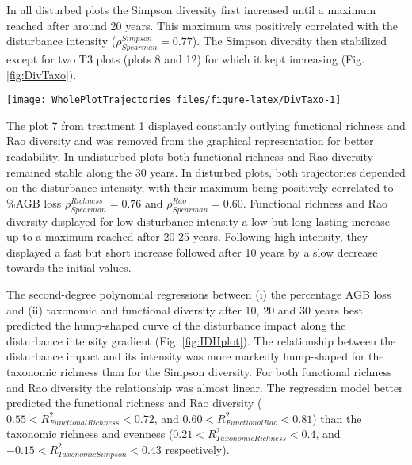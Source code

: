 \documentclass[fleqn,10pt]{ArtEcoFoG} %
\begin{document}
In all disturbed plots the Simpson diversity first increased until a
maximum reached after around 20 years. This maximum was positively
correlated with the disturbance intensity
(\(\rho_{Spearman}^{Simpson}=0.77\)). The Simpson diversity then
stabilized except for two T3 plots (plots 8 and 12) for which it kept
increasing (Fig. \ref{fig:DivTaxo}).

\begin{figure*}

{\centering \texttt{[image: WholePlotTrajectories\_files/figure-latex/DivTaxo-1]} 

}

\caption{Trajectories over 30 years of the difference with the 1989 inventory (2 years after disturbance) of community taxonomic richness \textbf{(a)}, Simpson diversity \textbf{(b)}, functional richness \textbf{(c)}, and Rao diversity \textbf{(d)}. Shaded areas are the credibility intervals }\label{fig:DivTaxo}
\end{figure*}

The plot 7 from treatment 1 displayed constantly outlying functional
richness and Rao diversity and was removed from the graphical
representation for better readability. In undisturbed plots both
functional richness and Rao diversity remained stable along the 30
years. In disturbed plots, both trajectories depended on the disturbance
intensity, with their maximum being positively correlated to \%AGB loss
\(\rho_{Spearman}^{Richness}=0.76\) and \(\rho_{Spearman}^{Rao}=0.60\).
Functional richness and Rao diversity displayed for low disturbance
intensity a low but long-lasting increase up to a maximum reached after
20-25 years. Following high intensity, they displayed a fast but short
increase followed after 10 years by a slow decrease towards the initial
values.

The second-degree polynomial regressions between (i) the percentage AGB
loss and (ii) taxonomic and functional diversity after 10, 20 and 30
years best predicted the hump-shaped curve of the disturbance impact
along the disturbance intensity gradient (Fig. \ref{fig:IDHplot}). The
relationship between the disturbance impact and its intensity was more
markedly hump-shaped for the taxonomic richness than for the Simpson
diversity. For both functional richness and Rao diversity the
relationship was almost linear. The regression model better predicted
the functional richness and Rao diversity
(\(0.55<R^2_{Functional Richness}<0.72\), and
\(0.60<R^2_{Functional Rao}<0.81\)) than the taxonomic richness and
evenness (\(0.21<R^2_{Taxonomic Richness}<0.4\), and
\(-0.15<R^2_{Taxonomic Simpson}<0.43\) respectively).
\end{document}
